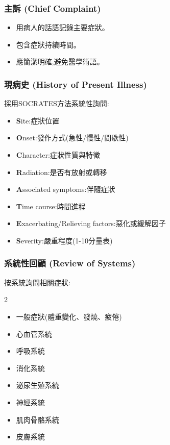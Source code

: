 \documentclass[12pt,a4paper]{article}
\begin{document}
\subsubsection{主訴 (Chief Complaint)}
\begin{itemize}[nosep]
    \item 用病人的話語記錄主要症狀。
    \item 包含症狀持續時間。
    \item 應簡潔明確,避免醫學術語。
\end{itemize}

\subsubsection{現病史 (History of Present Illness)}
採用SOCRATES方法系統性詢問:
\begin{itemize}[nosep]
    \item \textbf{S}ite:症狀位置
    \item \textbf{O}nset:發作方式(急性/慢性/間歇性)
    \item \textbf{C}haracter:症狀性質與特徵
    \item \textbf{R}adiation:是否有放射或轉移
    \item \textbf{A}ssociated symptoms:伴隨症狀
    \item \textbf{T}ime course:時間進程
    \item \textbf{E}xacerbating/Relieving factors:惡化或緩解因子
    \item \textbf{S}everity:嚴重程度(1-10分量表)
\end{itemize}

\subsubsection{系統性回顧 (Review of Systems)}
按系統詢問相關症狀:
\begin{multicols}{2}
\begin{itemize}[nosep]
    \item 一般症狀(體重變化、發燒、疲倦)
    \item 心血管系統
    \item 呼吸系統
    \item 消化系統
    \item 泌尿生殖系統
    \item 神經系統
    \item 肌肉骨骼系統
    \item 皮膚系統
\end{itemize}
\end{multicols}
\end{document}
